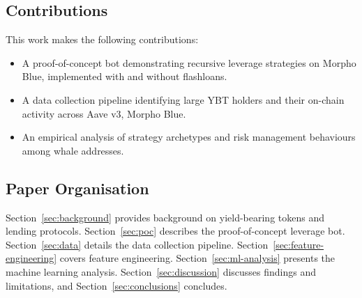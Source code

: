 \subsection{Contributions}

This work makes the following contributions:
\begin{itemize}
    \item A proof-of-concept bot demonstrating recursive leverage strategies on Morpho Blue, implemented with and without flashloans.
    \item A data collection pipeline identifying large YBT holders and their on-chain activity across Aave v3, Morpho Blue.
    \item An empirical analysis of strategy archetypes and risk management behaviours among whale addresses.
\end{itemize}

\subsection{Paper Organisation}

Section~\ref{sec:background} provides background on yield-bearing tokens and lending protocols. Section~\ref{sec:poc} describes the proof-of-concept leverage bot. Section~\ref{sec:data} details the data collection pipeline. Section~\ref{sec:feature-engineering} covers feature engineering. Section~\ref{sec:ml-analysis} presents the machine learning analysis. Section~\ref{sec:discussion} discusses findings and limitations, and Section~\ref{sec:conclusions} concludes.
